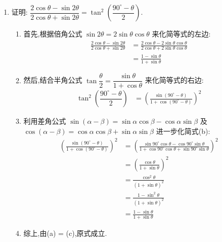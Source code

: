 \begin{questions}
\begin{enumerate}[label=(\arabic*)]
		\item 证明: \( \dfrac{2\cos\theta - \sin2\theta}{2\cos\theta + \sin2\theta} = \tan^2\left(\dfrac{90^\circ -
			      \theta}{2}\right) \).
		      \begin{proofsolution}
			      \begin{enumerate}[label=\protect\circled{\arabic*}]
				      \item 首先,根据倍角公式 \( \sin2\theta = 2\sin\theta\cos\theta \) 来化简等式的左边:
				            \begin{align*}
					            \frac{2\cos\theta - \sin2\theta}{2\cos\theta + \sin2\theta}
					             & = \frac{2\cos\theta - 2\sin\theta\cos\theta}{2\cos\theta + 2\sin\theta\cos\theta} \\
					             & = \frac{1-\sin\theta}{1+\sin\theta} \tag{a}
				            \end{align*}
				      \item 然后,结合半角公式 \( \tan\dfrac{\theta}{2} = \dfrac{\sin\theta}{1+\cos\theta} \)
				            来化简等式的右边:
				            \begin{align*}
					            \tan^2\left(\dfrac{90^\circ - \theta}{2}\right)
					             & = \left(\frac{\sin(90^\circ-\theta)}{1+\cos(90^\circ-\theta)}\right)^2 \tag{b}
				            \end{align*}
				      \item 利用差角公式 \( \sin(\alpha-\beta) = \sin\alpha\cos\beta - \cos\alpha\sin\beta \) 及 \(
				            \cos(\alpha - \beta) = \cos\alpha\cos\beta + \sin\alpha\sin\beta \) 进一步化简式(b):
				            \begin{align*}
					            \left(\frac{\sin(90^\circ-\theta)}{1+\cos(90^\circ-\theta)}\right)^2
					             & = \left(\frac{\sin90^\circ\cos\theta -
						            \cos90^\circ\sin\theta}{1+\cos90^\circ\cos\theta + \sin90^\circ\sin\theta}\right)^2
					            \\
					             & = \left(\frac{\cos\theta}{1+\sin\theta}\right)^2 \\
					             & = \frac{\cos^2\theta}{(1+\sin\theta)^2}          \\
					             & = \frac{1-\sin^2\theta}{(1+\sin\theta)^2}        \\
					             & = \frac{1-\sin\theta}{1+\sin\theta} \tag{c}
				            \end{align*}
				      \item 综上,由(a) = (c),原式成立.
			      \end{enumerate}

\end{proofsolution}
\end{enumerate}
\end{questions}
